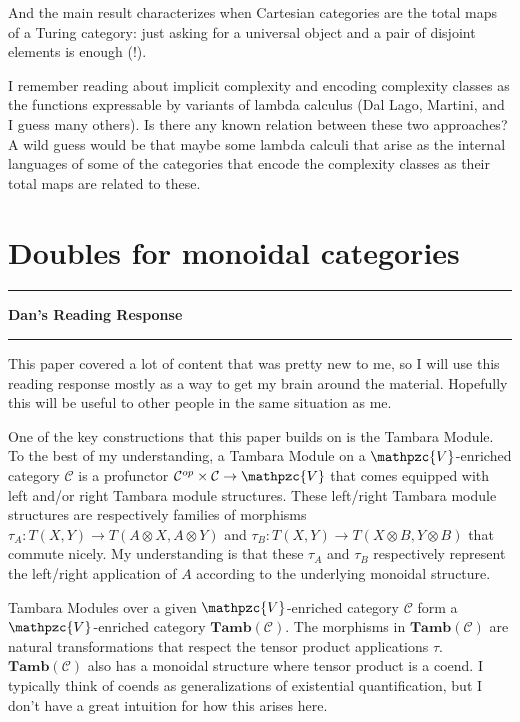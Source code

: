 \documentclass{amsart}
\newcommand{\iam}[1]{
  \vspace{0.25em}
  \hrule
  \vspace{0.25em}
  \textbf{{#1}'s Reading Response}
  \vspace{0.25em}
  \hrule
  \vspace{1em}
}
\begin{document}
And the main result characterizes when Cartesian categories are the total
maps of a Turing category: just asking for a universal object and a pair
of disjoint elements is enough (!).

I remember reading about implicit complexity and encoding complexity
classes as the functions expressable by variants of lambda calculus
(Dal Lago, Martini, and I guess many others).  Is there any known
relation between these two approaches?  A wild guess would be that
maybe some lambda calculi that arise as the internal languages of some
of the categories that encode the complexity classes as their total
maps are related to these.



\section{Doubles for monoidal categories}
\label{sec:doubles}

\iam{Dan}

This paper covered a lot of content that was pretty new to me, so I will use this reading response mostly as a way to get my brain around the material. Hopefully this will be useful to other people in the same situation as me.

One of the key constructions that this paper builds on is the Tambara Module. To the best of my understanding, a Tambara Module on a $\mathpzc{V}$-enriched category $\mathcal{C}$ is a profunctor $\mathcal{C}^{op} \times \mathcal{C} \rightarrow \mathpzc{V}$ that comes equipped with left and/or right Tambara module structures. These left/right Tambara module structures are respectively families of morphisms $\tau_A: T(X, Y) \rightarrow T(A \otimes X, A \otimes Y)$ and $\tau_B: T(X, Y) \rightarrow T(X \otimes B, Y \otimes B)$ that commute nicely. My understanding is that these $\tau_A$ and $\tau_B$ respectively represent the left/right application of $A$ according to the underlying monoidal structure.

Tambara Modules over a given $\mathpzc{V}$-enriched category $\mathcal{C}$ form a $\mathpzc{V}$-enriched category $\mathbf{Tamb}(\mathcal{C})$. The morphisms in $\mathbf{Tamb}(\mathcal{C})$ are natural transformations that respect the tensor product applications $\tau$. $\mathbf{Tamb}(\mathcal{C})$ also has a monoidal structure where tensor product is a coend. I typically think of coends as generalizations of existential quantification, but I don't have a great intuition for how this arises here.
\end{document}
